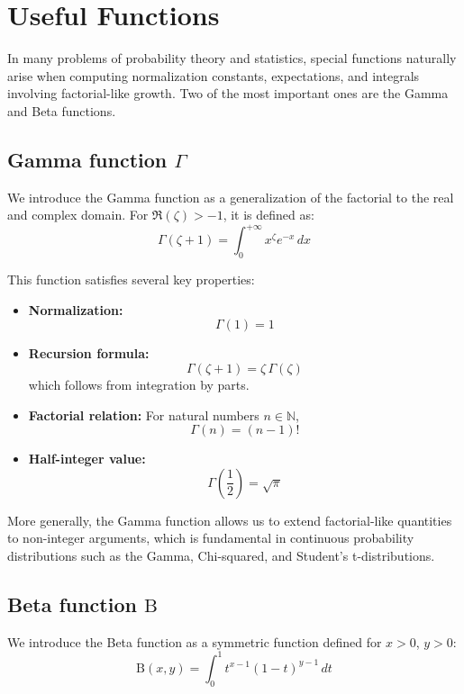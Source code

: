 \chapter{Useful Functions}

In many problems of probability theory and statistics, special functions naturally arise when computing normalization constants, expectations, and integrals involving factorial-like growth. Two of the most important ones are the Gamma and Beta functions.

\section{Gamma function $\Gamma$}\label{sec:gamma}

We introduce the Gamma function as a generalization of the factorial to the real and complex domain. For $\Re(\zeta) > -1$, it is defined as:
\[
\Gamma(\zeta+1) = \int_0^{+\infty} x^\zeta e^{-x} \, dx
\]

This function satisfies several key properties:

\begin{itemize}
	\item \textbf{Normalization:}
	\[
	\Gamma(1) = 1
	\]
	
	\item \textbf{Recursion formula:}
	\[
	\Gamma(\zeta+1) = \zeta \, \Gamma(\zeta)
	\]
	which follows from integration by parts.
	
	\item \textbf{Factorial relation:}
	For natural numbers $n \in \mathbb{N}$,
	\begin{equation}\label{eq:gamma}
		\Gamma(n) = (n-1)!
	\end{equation}
	
	\item \textbf{Half-integer value:}
	\[
	\Gamma\left(\frac{1}{2}\right) = \sqrt{\pi}
	\]
\end{itemize}

More generally, the Gamma function allows us to extend factorial-like quantities to non-integer arguments, which is fundamental in continuous probability distributions such as the Gamma, Chi-squared, and Student's t-distributions.

\clearpage
\section{Beta function $\mathrm{B}$}\label{sec:beta}

We introduce the Beta function as a symmetric function defined for $x > 0$, $y > 0$:
\[
\mathrm{B}(x,y) = \int_0^1 t^{x-1}(1-t)^{y-1} \, dt
\]

